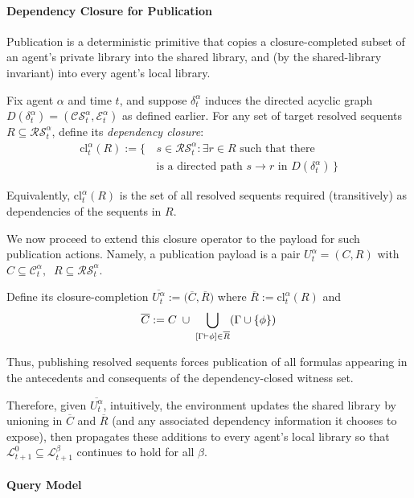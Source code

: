 \paragraph{Dependency Closure for Publication}

Publication is a deterministic primitive that copies a closure-completed subset of an agent's private library
into the shared library, and (by the shared-library invariant) into every agent's local library.

Fix agent $\alpha$ and time $t$, and suppose $\delta_t^\alpha$ induces the directed acyclic graph
$D(\delta_t^\alpha)=(\mathcal{CS}_t^\alpha,\mathcal{E}_t^\alpha)$ as defined earlier.
For any set of target resolved sequents $R\subseteq \mathcal{RS}_t^\alpha$, define its \emph{dependency closure}:
\begin{align*}
\mathrm{cl}^{\alpha}_t(R) := 
\Big\{\, &s\in \mathcal{RS}_t^\alpha : \exists r\in R \text{ such that there}\\& \text{is a directed path } s\to r
\text{ in } D(\delta_t^\alpha)\,\Big\}
\end{align*}

Equivalently, $\mathrm{cl}^\alpha_t(R)$ is the set of all resolved sequents required (transitively) as dependencies
of the sequents in $R$.


We now proceed to extend this closure operator to the payload for such publication actions. Namely, a publication payload is a pair $U_t^\alpha=(C,R)$ with $C\subseteq \mathcal{C}_t^\alpha,\;\; R\subseteq \mathcal{RS}_t^\alpha$.

Define its closure-completion $\overline{U_t^\alpha}:=\big(\overline{C},\overline{R}\big)$ where $\overline{R}:=\mathrm{cl}^\alpha_t(R)$ and
\[\overline{C}:= C \;\cup\; \bigcup_{[\Gamma\vdash\phi]\in \overline{R}}(\Gamma\cup\{\phi\})\]

Thus, publishing resolved sequents forces publication of all formulas appearing in the antecedents and consequents of the dependency-closed witness set.


Therefore, given $\overline{U_t^\alpha}$, intuitively, the environment updates the shared library by unioning in $\overline{C}$ and $\overline{R}$ (and any associated dependency information it chooses to expose),
then propagates these additions to every agent's local library so that $\mathcal{L}^0_{t+1}\subseteq \mathcal{L}^\beta_{t+1}$
continues to hold for all $\beta$.



\paragraph{Query Model}

